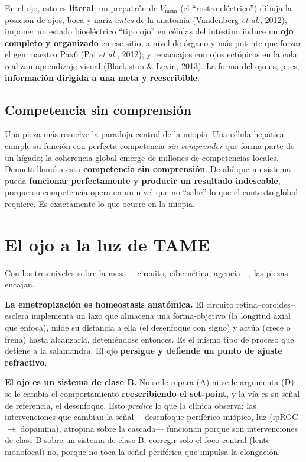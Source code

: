 \documentclass[11pt,a4paper]{article}
\begin{document}
En el ojo, esto es \textbf{literal}: un prepatrón de $V_\mathrm{mem}$ (el \enquote{rostro eléctrico}) dibuja la posición de ojos, boca y nariz \emph{antes} de la anatomía (Vandenberg \emph{et al.}, 2012); imponer un estado bioeléctrico \enquote{tipo ojo} en células del intestino induce un \textbf{ojo completo y organizado} en ese sitio, a nivel de órgano y más potente que forzar el gen maestro Pax6 (Pai \emph{et al.}, 2012); y renacuajos con ojos ectópicos en la cola realizan aprendizaje visual (Blackiston \& Levin, 2013). La forma del ojo es, pues, \textbf{información dirigida a una meta y reescribible}.

\subsection{Competencia sin comprensión}

Una pieza más resuelve la paradoja central de la miopía. Una célula hepática cumple su función con perfecta competencia \emph{sin comprender} que forma parte de un hígado; la coherencia global emerge de millones de competencias locales. Dennett llamó a esto \textbf{competencia sin comprensión}. De ahí que un sistema pueda \textbf{funcionar perfectamente y producir un resultado indeseable}, porque su competencia opera en un nivel que no \enquote{sabe} lo que el contexto global requiere. Es exactamente lo que ocurre en la miopía.

\section{El ojo a la luz de TAME}

Con los tres niveles sobre la mesa ---circuito, cibernética, agencia---, las piezas encajan.

\textbf{La emetropización es homeostasis anatómica.} El circuito retina--coroides--esclera implementa un lazo que almacena una forma-objetivo (la longitud axial que enfoca), mide su distancia a ella (el desenfoque con signo) y actúa (crece o frena) hasta alcanzarla, deteniéndose entonces. Es el mismo tipo de proceso que detiene a la salamandra. El ojo \textbf{persigue y defiende un punto de ajuste refractivo}.

\textbf{El ojo es un sistema de clase B.} No se le repara (A) ni se le argumenta (D): se le cambia el comportamiento \textbf{reescribiendo el set-point}, y la vía es su señal de referencia, el desenfoque. Esto \emph{predice} lo que la clínica observa: las intervenciones que cambian la señal ---desenfoque periférico miópico, luz (ipRGC $\rightarrow$ dopamina), atropina sobre la cascada--- funcionan porque son intervenciones de clase B sobre un sistema de clase B; corregir solo el foco central (lente monofocal) no, porque no toca la señal periférica que impulsa la elongación.
\end{document}
